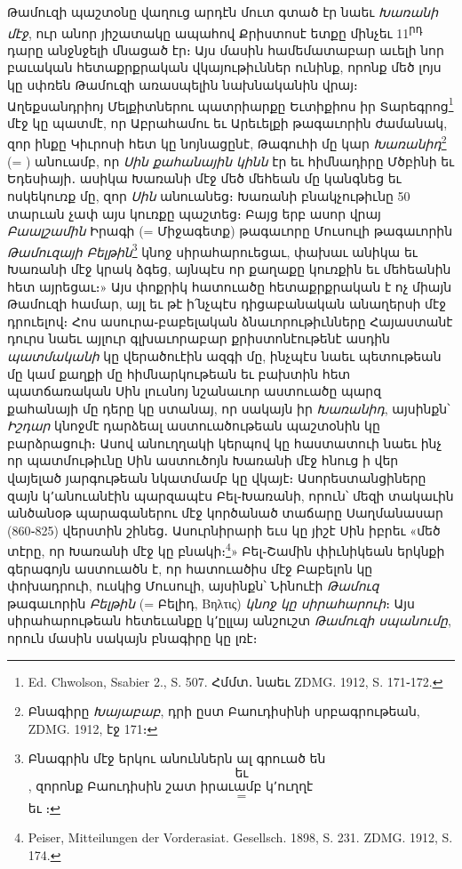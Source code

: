 \documentclass{article}
\newcommand*\svgAAAC{}
\newcommand*\svgAAAD{}
\newcommand*\svgAAAE{}
\newcommand*\svgAAAF{}
\newcommand*\svgAAAG{}
\newcommand*\svgAAAH{}
\begin{document}
{Թամուզի պաշտօնը վաղուց արդէն մուտ գտած էր նաեւ \emph{Խառանի մէջ}, ուր անոր յիշատակը ապահով Քրիստոսէ ետքը մինչեւ 11\textsuperscript{րդ} դարը անջնջելի մնացած էր։ Այս մասին համեմատաբար աւելի նոր բաւական հետաքրքրական վկայութիւններ ունինք, որոնք մեծ լոյս կը սփռեն Թամուզի առասպելին նախնականին վրայ։ Աղեքսանդրիոյ Մելքիտներու պատրիարքը Եւտիքիոս իր Տարեգրոց\footnote{Ed. Chwolson, Ssabier 2., S. 507. Հմմտ․ նաեւ ZDMG. 1912, S. 171֊172.} մէջ կը պատմէ, որ Աբրահամու եւ Արեւելքի թագաւորին ժամանակ, զոր ինքը Կիւրոսի հետ կը նոյնացընէ, Թագուհի մը կար \emph{Խառանիդ}\footnote{Բնագիրը \emph{Խայաբաբ}, դրի ըստ Բաուդիսինի սրբագրութեան, ZDMG. 1912, էջ 171։} (= $\svgAAAC$) անուամբ, որ \emph{Սին քահանային կինն} էր եւ հիմնադիրը Մծբինի եւ Եդեսիայի․ ասիկա Խառանի մէջ մեծ մեհեան մը կանգնեց եւ ոսկեկուռք մը, զոր \emph{Սին} անուանեց։ Խառանի բնակչութիւնը 50 տարւան չափ այս կուռքը պաշտեց։ Բայց երբ ասոր վրայ \emph{Բաալշամին} Իրագի (= Միջագետք) թագաւորը Մուսուլի թագաւորին \emph{Թամուզայի Բելթին}\footnote{Բնագրին մէջ երկու անուններն ալ գրուած են $\svgAAAD$ եւ $\svgAAAE$, զորոնք Բաուդիսին շատ իրաւամբ կ՚ուղղէ $\svgAAAF$ = $\svgAAAG$ եւ $\svgAAAH$։} կնոջ սիրահարուեցաւ, փախաւ անիկա եւ Խառանի մէջ կրակ ձգեց, այնպէս որ քաղաքը կուռքին եւ մեհեանին հետ այրեցաւ։» Այս փոքրիկ հատուածը հետաքրքրական է ոչ միայն Թամուզի համար, այլ եւ թէ ի՛նչպէս դիցաբանական անաղերսի մէջ դրուելով։ Հոս ասուրա֊բաբելական ձնաւորութիւնները Հայաստանէ դուրս նաեւ այլուր գլխաւորաբար քրիստոնէութենէ ասդին \emph{պատմականի} կը վերածուէին ազգի մը, ինչպէս նաեւ պետութեան մը կամ քաղքի մը հիմնարկութեան եւ բախտին հետ պատճառական Սին լուսնոյ նշանաւոր աստուածը պարզ քահանայի մը դերը կը ստանայ, որ սակայն իր \emph{Խառանիդ}, այսինքն՝ \emph{Իշդար} կնոջմէ դարձեալ աստուածութեան պաշտօնին կը բարձրացուի։ Ասով անուղղակի կերպով կը հաստատուի նաեւ ինչ որ պատմութիւնը Սին աստուծոյն Խառանի մէջ հնուց ի վեր վայելած յարգութեան նկատմամբ կը վկայէ։ Ասորեստանցիները զայն կ՚անուանէին պարզապէս Բել֊Խառանի, որուն՝ մեզի տակաւին անծանօթ պարագաներու մէջ կործանած տաճարը Սաղմանասար (860֊825) վերստին շինեց․ Ասուրնիրարի եւս կը յիշէ Սին իբրեւ «մեծ տէրը, որ Խառանի մէջ կը բնակի։\footnote{Peiser, Mitteilungen der Vorderasiat. Gesellsch. 1898, S. 231. ZDMG. 1912, S. 174.}» Բել֊Շամին փիւնիկեան երկնքի գերագոյն աստուածն է, որ հատուածիս մէջ Բաբելոն կը փոխադրուի, ուսկից Մուսուլի, այսինքն՝ Նինուէի \emph{Թամուզ} թագաւորին \emph{Բելթին} (= Բելիդ, Βηλτις) \emph{կնոջ կը սիրահարուի}։ Այս սիրահարութեան հետեւանքը կ՚ըլլայ անշուշտ \emph{Թամուզի սպանումը}, որուն մասին սակայն բնագիրը կը լռէ։

}
\end{document}
